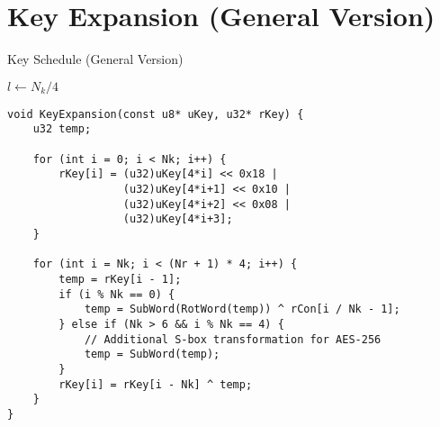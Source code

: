 \newpage
\section{Key Expansion (General Version)}
\begin{algorithm}[H]
	\caption{Key Schedule (General Version)}
	
	\BlankLine
	$l\gets N_k/4$
\end{algorithm}
\begin{lstlisting}[style=C, caption={Key Expansion in C (General ver.)},captionpos=t]
void KeyExpansion(const u8* uKey, u32* rKey) {
	u32 temp;
	
	for (int i = 0; i < Nk; i++) {
		rKey[i] = (u32)uKey[4*i] << 0x18 | 
				  (u32)uKey[4*i+1] << 0x10 | 
				  (u32)uKey[4*i+2] << 0x08 | 
				  (u32)uKey[4*i+3];
	}
	
	for (int i = Nk; i < (Nr + 1) * 4; i++) {
		temp = rKey[i - 1];
		if (i % Nk == 0) {
			temp = SubWord(RotWord(temp)) ^ rCon[i / Nk - 1];
		} else if (Nk > 6 && i % Nk == 4) {
			// Additional S-box transformation for AES-256
			temp = SubWord(temp);
		}
		rKey[i] = rKey[i - Nk] ^ temp;
	}
}
\end{lstlisting}
\newpage

\newpage

